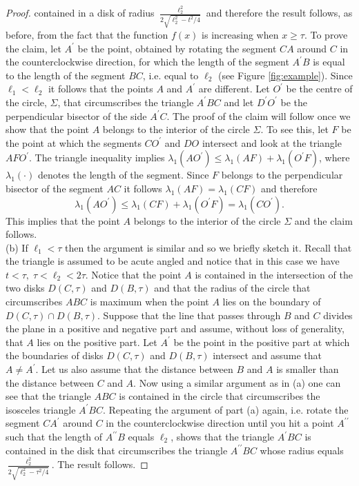 \documentclass[12pt]{article}
\begin{document}
\begin{proof}
contained in a disk of radius  $\frac{\ell_2^2}{2\sqrt{\ell_{2}^{2} -t^2/4} }$ 
and therefore the result follows, as before, from the fact that the function $f(x)$ is increasing when $x\geq \tau$. 
To prove the claim, let $A^{\prime}$ be the point, obtained by rotating the segment $CA$ around $C$
in the counterclockwise direction, for which  
the length of the segment $A^{\prime}B$ is equal to the length of the segment 
$BC$, i.e. equal to $\ell_2$ (see Figure \ref{fig:example}). Since 
$\ell_1 <\ell_2$ it follows that the points $A$ and $A^{\prime}$ are different. 
Let $O^{\prime}$ be the centre of the circle, $\Sigma$, 
that circumscribes the triangle $A^{\prime}BC$ and 
let $D^{\prime}O^{\prime}$ 
be the perpendicular bisector of the side $A^{\prime}C$.  
The proof of the claim will follow once we show that the 
point $A$ belongs to the interior of the circle $\Sigma$. To see this, let $F$ be the point at which the 
segments $CO^{\prime}$ and $DO$ intersect and look at the triangle $AFO^{\prime}$. The triangle 
inequality implies $\lambda_1(AO^{\prime}) \leq \lambda_1(AF) + \lambda_1(O^{\prime}F)$, where 
$\lambda_1(\cdot)$ denotes the length of the segment. Since $F$ belongs to the perpendicular bisector 
of the segment $AC$ it follows $\lambda_1(AF) = \lambda_1(CF)$ and therefore 
\[\lambda_1(AO^{\prime}) \leq \lambda_1(CF) + \lambda_1(O^{\prime}F) = \lambda_1(CO^{\prime}). \]
This implies that the point $A$ belongs to the interior of the circle $\Sigma$ and the claim follows. \\
(b) If $\ell_1 < \tau$ then the argument is similar and so we briefly 
sketch it. Recall that the triangle is assumed to be acute angled 
and notice that in this case we have $t<\tau, \; \tau<\ell_2<2\tau$. 
Notice that the point $A$ is contained in the intersection of the two disks $D(C,\tau)$ and $D(B,\tau)$ and 
that the radius of the circle that circumscribes $ABC$ is maximum when the point $A$ lies on the 
boundary of $D(C,\tau)\cap D(B,\tau)$. 
Suppose that the line that passes through $B$ and $C$ divides the plane in a positive and negative part 
and assume, 
without loss of generality, that 
$A$ lies on the positive part. Let $A^{\prime}$ be the point in the positive part at which the 
boundaries of disks $D(C,\tau)$ and $D(B,\tau)$ intersect and assume that $A\neq A^{\prime}$. 
Let us also assume that the distance between $B$ and $A$ is smaller than 
the distance between $C$ and $A$. 
Now using a similar argument as in (a) one can    
see that the triangle $ABC$ is contained in the circle that circumscribes the  
isosceles triangle $A^{\prime}BC$.
Repeating the argument of part (a) again, i.e. rotate the segment   
$CA^{\prime}$ around $C$
in the counterclockwise direction until you hit a point $A^{\prime \prime}$ such that the length 
of $A^{\prime\prime}B$ equals $\ell_2$, shows that the triangle $A^{\prime}BC$ is contained 
in the disk that circumscribes the triangle $A^{\prime\prime}BC$ 
whose radius equals $\frac{\ell_2^2}{2\sqrt{\ell_{2}^{2} -\tau^2/4} }$.
The result follows. 
\end{proof}
\end{document}

